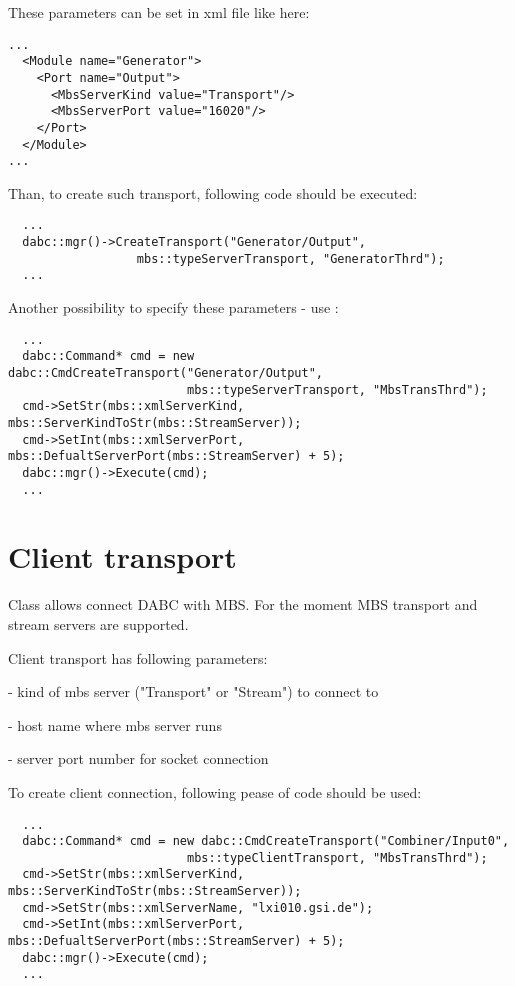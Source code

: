 These parameters can be set in xml file like here:
\begin{verbatim}
...
  <Module name="Generator">
    <Port name="Output">
      <MbsServerKind value="Transport"/>
      <MbsServerPort value="16020"/>
    </Port>
  </Module>
...
\end{verbatim}

Than, to create such transport, following code should be executed:
\begin{verbatim}
  ...
  dabc::mgr()->CreateTransport("Generator/Output", 
                  mbs::typeServerTransport, "GeneratorThrd");
  ...
\end{verbatim}


Another possibility to specify these parameters - use :
\begin{verbatim}
  ...
  dabc::Command* cmd = new dabc::CmdCreateTransport("Generator/Output", 
                         mbs::typeServerTransport, "MbsTransThrd");
  cmd->SetStr(mbs::xmlServerKind, mbs::ServerKindToStr(mbs::StreamServer));
  cmd->SetInt(mbs::xmlServerPort, mbs::DefualtServerPort(mbs::StreamServer) + 5);
  dabc::mgr()->Execute(cmd);
  ...
\end{verbatim}



\section{Client transport}

Class  allows connect DABC with MBS. 
For the moment MBS transport and stream servers are supported.  

Client transport has following parameters:
\bbul
\item {}  - kind of mbs server ("Transport" or "Stream") to connect to  
\item {}  - host name where mbs server runs 
\item {}  - server port number for socket connection
\ebul

To create client connection, following pease of code should be used:

\begin{verbatim}
  ...
  dabc::Command* cmd = new dabc::CmdCreateTransport("Combiner/Input0", 
                         mbs::typeClientTransport, "MbsTransThrd");
  cmd->SetStr(mbs::xmlServerKind, mbs::ServerKindToStr(mbs::StreamServer));
  cmd->SetStr(mbs::xmlServerName, "lxi010.gsi.de");
  cmd->SetInt(mbs::xmlServerPort, mbs::DefualtServerPort(mbs::StreamServer) + 5);
  dabc::mgr()->Execute(cmd);
  ...
\end{verbatim}

